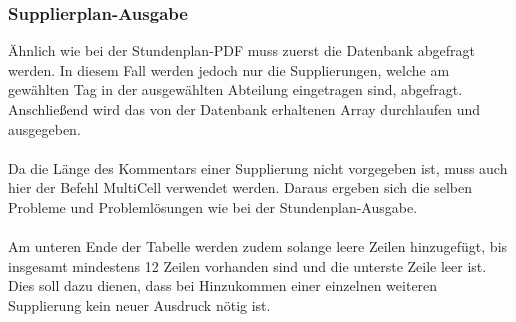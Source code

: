 


\subsubsection{Supplierplan-Ausgabe}

Ähnlich wie bei der Stundenplan-PDF muss zuerst die Datenbank abgefragt werden. In diesem Fall werden jedoch nur die Supplierungen, welche am gewählten Tag in der ausgewählten Abteilung eingetragen sind, abgefragt.\\
Anschließend wird das von der Datenbank erhaltenen Array durchlaufen und ausgegeben.\\\\
Da die Länge des Kommentars einer Supplierung nicht vorgegeben ist, muss auch hier der Befehl MultiCell verwendet werden. Daraus ergeben sich die selben Probleme und Problemlösungen wie bei der Stundenplan-Ausgabe.\\\\
Am unteren Ende der Tabelle werden zudem solange leere Zeilen hinzugefügt, bis insgesamt mindestens 12 Zeilen vorhanden sind und die unterste Zeile leer ist. Dies soll dazu dienen, dass bei Hinzukommen einer einzelnen weiteren Supplierung kein neuer Ausdruck nötig ist.
